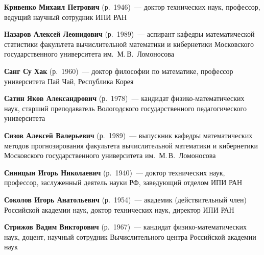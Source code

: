 \begin{multicols}{2}
\vspace*{4pt}

\noindent
\textbf{Кривенко Михаил Петрович} (р.\ 1946)~--- доктор технических наук, профессор, 
ведущий научный сотрудник ИПИ РАН

\vspace*{4pt}

\noindent
\textbf{Назаров Алексей Леонидович} (р.\ 1989)~--- аспирант кафедры математической
статистики факультета вычислительной математики и 
кибернетики Московского государственного университета им.\ М.\,В.~Ломоносова


\vspace*{4pt}



\noindent
\textbf{Санг Су Хак} (р.\ 1960)~--- доктор философии по математике,
профессор университета Пай Чай, Республика Корея

\vspace*{4pt}



\noindent
\textbf{Сатин Яков Александрович} (р.\ 1978)~--- кандидат фи\-зи\-ко-математических наук,
старший преподаватель Вологодского государственного
педагогического университета

\vspace*{4pt}

\noindent
\textbf{Сизов Алексей Валерьевич} (р.\ 1989)~--- выпускник кафедры 
математических методов прогнозирования факультета
вычислительной математики и 
кибернетики Московского государственного университета им.\ М.\,В.~Ломоносова

\pagebreak

\noindent
\textbf{Синицын Игорь Николаевич} (р.\ 1940)~--- 
доктор технических наук, профессор, заслуженный деятель науки РФ, заведующий отделом
ИПИ РАН

\vspace*{4pt}

\noindent 
\textbf{Соколов Игорь Анатольевич} (р.\ 1954)~---
академик (действительный член) Российской академии наук,
доктор технических наук, директор ИПИ РАН

\vspace*{2pt}

\noindent
\textbf{Стрижов Вадим Викторович} (р.\ 1967)~--- кандидат фи\-зи\-ко-ма\-те\-ма\-ти\-че\-ских наук,
доцент, научный сотрудник Вычислительного центра Российской академии наук




\vspace*{2pt}



\end{multicols}
